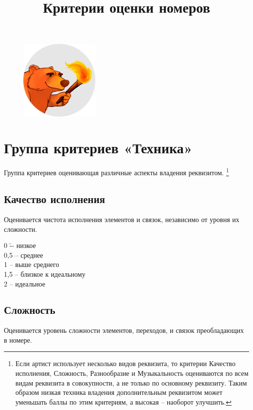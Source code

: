 \documentclass[12pt]{article}
\date{}
\begin{document}
\title{\textbf{Критерии оценки номеров}}

\begin{figure}
\centering
\includegraphics[width=0.35\textwidth]{logo}
\end{figure}

\maketitle

\section{Группа критериев «Техника»}
Группа критериев оценивающая различные аспекты владения реквизитом.
\footnote{Если артист использует несколько видов реквизита, то критерии Качество исполнения, Сложность, Разнообразие и Музыкальность оцениваются по всем видам реквизита в совокупности, а не только по основному реквизиту. Таким образом низкая техника владения дополнительным реквизитом может уменьшать баллы по этим критериям, а высокая -- наоборот улучшить.}

\subsection{Качество исполнения} 
Оценивается чистота исполнения элементов и связок, независимо от уровня их сложности.
\begin{tabbing}
0\hspace{0.8em} \= -- низкое\\
0,5 \>-- среднее\\
1 \>-- выше среднего\\
1,5 \>-- близкое к идеальному\\
2 \>-- идеальное
\end{tabbing}

\subsection{Сложность} 
Оценивается уровень сложности элементов, переходов, и связок преобладающих в номере.
\end{document}

